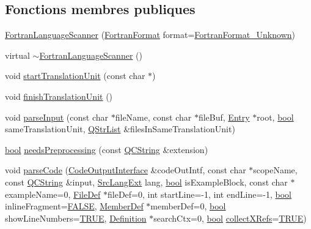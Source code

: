 \subsection*{Fonctions membres publiques}
\begin{DoxyCompactItemize}
\item 
\hyperlink{class_fortran_language_scanner_aca495d95c594b1fe4ed120aa03a30f3e}{Fortran\+Language\+Scanner} (\hyperlink{types_8h_ad3f2a8c13ceee9c0aaeabf930dd88266}{Fortran\+Format} format=\hyperlink{types_8h_ad3f2a8c13ceee9c0aaeabf930dd88266a255a836d2cd9b5c3d58e71ff153598a5}{Fortran\+Format\+\_\+\+Unknown})
\item 
virtual \hyperlink{class_fortran_language_scanner_af9a3eb54c4149bbe3f0f665774759be0}{$\sim$\+Fortran\+Language\+Scanner} ()
\item 
void \hyperlink{class_fortran_language_scanner_a571f9440b581ce6fdc1b15c08427932d}{start\+Translation\+Unit} (const char $\ast$)
\item 
void \hyperlink{class_fortran_language_scanner_abf5a872f1e3bd81f5a285e9586869def}{finish\+Translation\+Unit} ()
\item 
void \hyperlink{class_fortran_language_scanner_a6f2e7fa4a4d46ae48289cd135f9f495d}{parse\+Input} (const char $\ast$file\+Name, const char $\ast$file\+Buf, \hyperlink{class_entry}{Entry} $\ast$root, \hyperlink{qglobal_8h_a1062901a7428fdd9c7f180f5e01ea056}{bool} same\+Translation\+Unit, \hyperlink{class_q_str_list}{Q\+Str\+List} \&files\+In\+Same\+Translation\+Unit)
\item 
\hyperlink{qglobal_8h_a1062901a7428fdd9c7f180f5e01ea056}{bool} \hyperlink{class_fortran_language_scanner_a94620ec6b6cf583dccd2544671e9e578}{needs\+Preprocessing} (const \hyperlink{class_q_c_string}{Q\+C\+String} \&extension)
\item 
void \hyperlink{class_fortran_language_scanner_a76c29cd4656300093fba9179184a4a7c}{parse\+Code} (\hyperlink{class_code_output_interface}{Code\+Output\+Interface} \&code\+Out\+Intf, const char $\ast$scope\+Name, const \hyperlink{class_q_c_string}{Q\+C\+String} \&input, \hyperlink{types_8h_a9974623ce72fc23df5d64426b9178bf2}{Src\+Lang\+Ext} lang, \hyperlink{qglobal_8h_a1062901a7428fdd9c7f180f5e01ea056}{bool} is\+Example\+Block, const char $\ast$example\+Name=0, \hyperlink{class_file_def}{File\+Def} $\ast$file\+Def=0, int start\+Line=-\/1, int end\+Line=-\/1, \hyperlink{qglobal_8h_a1062901a7428fdd9c7f180f5e01ea056}{bool} inline\+Fragment=\hyperlink{qglobal_8h_a10e004b6916e78ff4ea8379be80b80cc}{F\+A\+L\+S\+E}, \hyperlink{class_member_def}{Member\+Def} $\ast$member\+Def=0, \hyperlink{qglobal_8h_a1062901a7428fdd9c7f180f5e01ea056}{bool} show\+Line\+Numbers=\hyperlink{qglobal_8h_a04a6422a52070f0dc478693da640242b}{T\+R\+U\+E}, \hyperlink{class_definition}{Definition} $\ast$search\+Ctx=0, \hyperlink{qglobal_8h_a1062901a7428fdd9c7f180f5e01ea056}{bool} \hyperlink{tclscanner_8cpp_ac23b94d6976d5bb0c9f1885c5a2e7a53}{collect\+X\+Refs}=\hyperlink{qglobal_8h_a04a6422a52070f0dc478693da640242b}{T\+R\+U\+E})

\end{DoxyCompactItemize}
